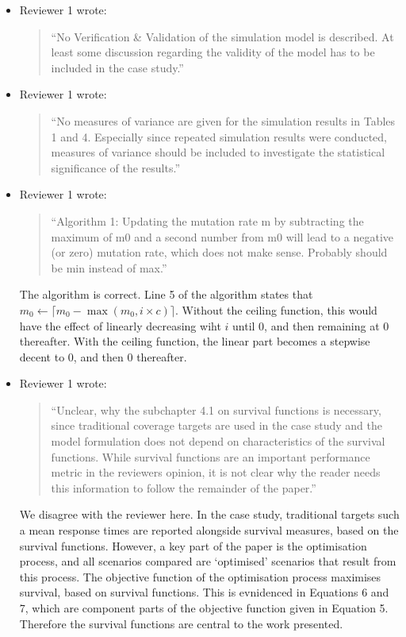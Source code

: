 \documentclass{article}
\begin{document}
\begin{itemize}

\item Reviewer 1 wrote:
\begin{quote}
``No Verification \& Validation of the simulation model is described. At least some discussion regarding the validity of the model has to be included in the case study.''
\end{quote}

\item Reviewer 1 wrote:
\begin{quote}
``No measures of variance are given for the simulation results in Tables 1 and 4. Especially since repeated simulation results were conducted, measures of variance should be included to investigate the statistical significance of the results.''
\end{quote}

\item Reviewer 1 wrote:
\begin{quote}
``Algorithm 1: Updating the mutation rate m by subtracting the maximum of m0 and a second number from m0 will lead to a negative (or zero) mutation rate, which does not make sense. Probably should be min instead of max.''
\end{quote}
The algorithm is correct. Line 5 of the algorithm states that $m_0 \leftarrow \lceil m_0 - \max(m_0, i \times c) \rceil$. Without the ceiling function, this would have the effect of linearly decreasing wiht $i$ until 0, and then remaining at 0 thereafter. With the ceiling function, the linear part becomes a stepwise decent to 0, and then 0 thereafter.

\item Reviewer 1 wrote:
\begin{quote}
``Unclear, why the subchapter 4.1 on survival functions is necessary, since traditional coverage targets are used in the case study and the model formulation does not depend on characteristics of the survival functions. While survival functions are an important performance metric in the reviewers opinion, it is not clear why the reader needs this information to follow the remainder of the paper.''
\end{quote}
We disagree with the reviewer here. In the case study, traditional targets such a mean response times are reported alongside survival measures, based on the survival functions. However, a key part of the paper is the optimisation process, and all scenarios compared are `optimised' scenarios that result from this process. The objective function of the optimisation process maximises survival, based on survival functions. This is evnidenced in Equations 6 and 7, which are component parts of the objective function given in Equation 5. Therefore the survival functions are central to the work presented.


\end{itemize}
\end{document}
